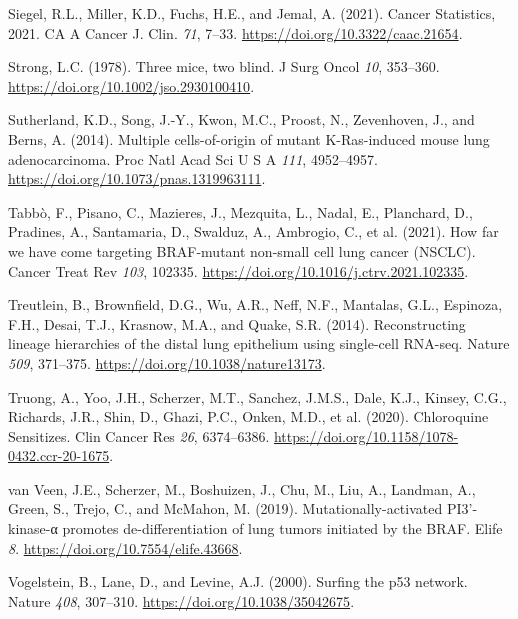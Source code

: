 \begin{CSLReferences}{0}{0}
\leavevmode{}%
Siegel, R.L., Miller, K.D., Fuchs, H.E., and Jemal, A. (2021). Cancer Statistics, 2021. CA A Cancer J. Clin. \emph{71}, 7--33. \url{https://doi.org/10.3322/caac.21654}.

\leavevmode{}%
Strong, L.C. (1978). Three mice, two blind. J Surg Oncol \emph{10}, 353--360. \url{https://doi.org/10.1002/jso.2930100410}.

\leavevmode{}%
Sutherland, K.D., Song, J.-Y., Kwon, M.C., Proost, N., Zevenhoven, J., and Berns, A. (2014). Multiple cells-of-origin of mutant K-Ras-induced mouse lung adenocarcinoma. Proc Natl Acad Sci U S A \emph{111}, 4952--4957. \url{https://doi.org/10.1073/pnas.1319963111}.

\leavevmode{}%
Tabbò, F., Pisano, C., Mazieres, J., Mezquita, L., Nadal, E., Planchard, D., Pradines, A., Santamaria, D., Swalduz, A., Ambrogio, C., et al. (2021). How far we have come targeting BRAF-mutant non-small cell lung cancer (NSCLC). Cancer Treat Rev \emph{103}, 102335. \url{https://doi.org/10.1016/j.ctrv.2021.102335}.

\leavevmode{}%
Treutlein, B., Brownfield, D.G., Wu, A.R., Neff, N.F., Mantalas, G.L., Espinoza, F.H., Desai, T.J., Krasnow, M.A., and Quake, S.R. (2014). Reconstructing lineage hierarchies of the distal lung epithelium using single-cell RNA-seq. Nature \emph{509}, 371--375. \url{https://doi.org/10.1038/nature13173}.

\leavevmode{}%
Truong, A., Yoo, J.H., Scherzer, M.T., Sanchez, J.M.S., Dale, K.J., Kinsey, C.G., Richards, J.R., Shin, D., Ghazi, P.C., Onken, M.D., et al. (2020). Chloroquine Sensitizes. Clin Cancer Res \emph{26}, 6374--6386. \url{https://doi.org/10.1158/1078-0432.ccr-20-1675}.

\leavevmode{}%
van Veen, J.E., Scherzer, M., Boshuizen, J., Chu, M., Liu, A., Landman, A., Green, S., Trejo, C., and McMahon, M. (2019). Mutationally-activated PI3'-kinase-α promotes de-differentiation of lung tumors initiated by the BRAF. Elife \emph{8}. \url{https://doi.org/10.7554/elife.43668}.

\leavevmode{}%
Vogelstein, B., Lane, D., and Levine, A.J. (2000). Surfing the p53 network. Nature \emph{408}, 307--310. \url{https://doi.org/10.1038/35042675}.


\end{CSLReferences}
